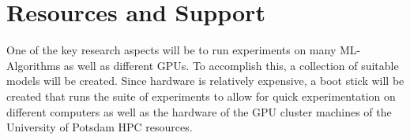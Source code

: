 \documentclass[12pt]{article}
\begin{document}
\section{Resources and Support}
One of the key research aspects will be to run experiments on many ML-Algorithms as well as different GPUs. To accomplish this, a collection of suitable models will be created. Since hardware is relatively expensive, a boot stick will be created that runs the suite of experiments to allow for quick experimentation on different computers as well as the hardware of the GPU cluster machines of the University of Potsdam HPC resources.
\end{document}
